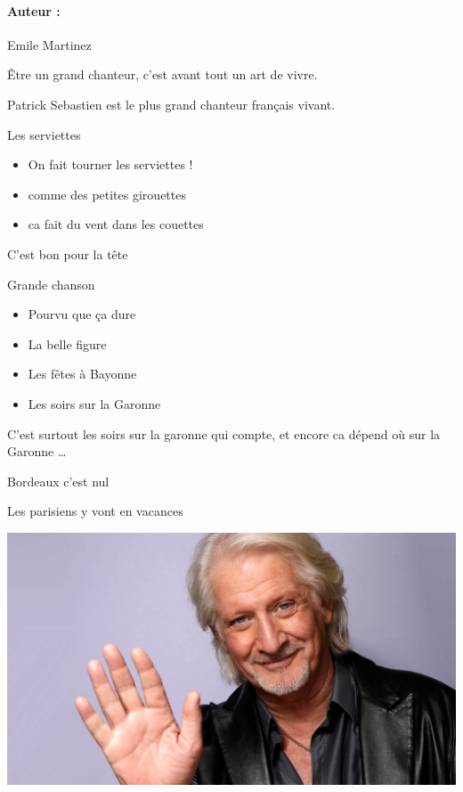 \documentclass[11pt]{article}
\newenvironment{exemple}[1][]{\begin{ex}{#1}{}}{\end{ex}}
\newenvironment{preuve}[1][]{\begin{pr}{#1}{}}{\end{pr}}
\newenvironment{correction}[1][]{\begin{corr}{#1}{}}{\end{corr}}
\newenvironment{note}[1][]{\begin{nt}{#1}{}}{\end{nt}}
\newenvironment{definition}[1][]{\begin{df}{#1}{}}{\end{df}}
\newenvironment{theoreme}[1][]{\begin{theo}{#1}{}}{\end{theo}}
\newenvironment{theoreme*}[1][]{\begin{theo*}{#1}}{\end{theo*}}
\newenvironment{lemme}[1][]{\begin{lm}{#1}{}}{\end{lm}}
\newcommand{\dev}[1]{\paragraph{Auteur :} #1 \\}
\begin{document}
	
	\dev{Emile Martinez}
	
	\begin{definition}
		Être un grand chanteur, c'est avant tout un art de vivre.
	\end{definition}
	
	\begin{theoreme*}
		Patrick Sebastien est le plus grand chanteur français vivant.
	\end{theoreme*}
	
	\begin{theoreme}[Les serviettes]
		\begin{itemize}[label=$\star$]
	 		\item On fait tourner les serviettes !
	 		\item comme des petites girouettes
	 		\item ca fait du vent dans les couettes
	 	\end{itemize}
	\end{theoreme}
	
	\begin{preuve}
		C'est bon pour la tête
	\end{preuve}
	
	\begin{lemme}[Grande chanson]
		\begin{itemize}[label=$\bullet$]
			\item Pourvu que ça dure
			\item La belle figure
			\item Les fêtes à Bayonne
			\item Les soirs sur la Garonne
		\end{itemize}
	\end{lemme}
	
	\begin{note}
		C'est surtout les soirs sur la garonne qui compte, et encore ca dépend où sur la Garonne \dots
	\end{note}
	
	\begin{exemple}
		Bordeaux c'est nul
	\end{exemple}
	
	\begin{correction}
		Les parisiens y vont en vacances
	\end{correction}
	
	\begin{center}
		\includegraphics[width=0.5\linewidth]{Pat_Seb.png}
	\end{center}
	
\end{document}
